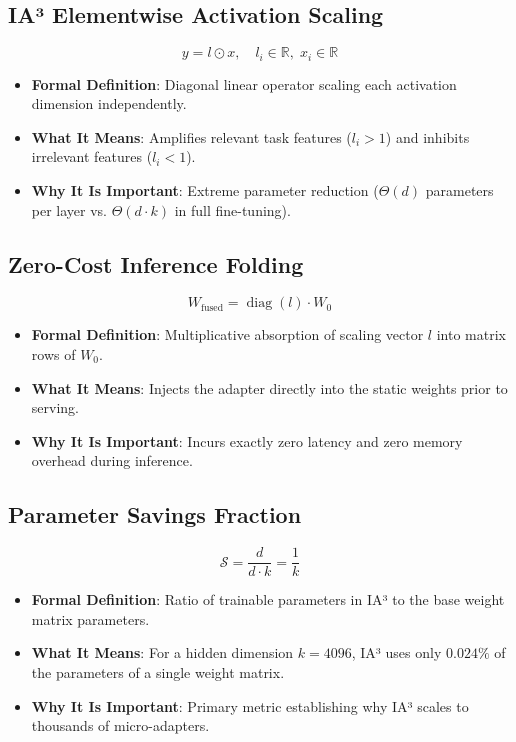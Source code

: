 \documentclass[11pt,a4paper]{article}
\theoremstyle{definition}
\begin{document}
\subsection{IA³ Elementwise Activation Scaling}
{\boldmath
\begin{equation}
y = l \odot x, \quad l_i \in \mathbb{R}, \; x_i \in \mathbb{R}
\end{equation}
}
\begin{itemize}
    \item \textbf{Formal Definition}: Diagonal linear operator scaling each activation dimension independently.
    \item \textbf{What It Means}: Amplifies relevant task features ($l_i > 1$) and inhibits irrelevant features ($l_i < 1$).
    \item \textbf{Why It Is Important}: Extreme parameter reduction ($\Theta(d)$ parameters per layer vs. $\Theta(d \cdot k)$ in full fine-tuning).
\end{itemize}

\subsection{Zero-Cost Inference Folding}
{\boldmath
\begin{equation}
W_{\text{fused}} = \operatorname{diag}(l) \cdot W_0
\end{equation}
}
\begin{itemize}
    \item \textbf{Formal Definition}: Multiplicative absorption of scaling vector $l$ into matrix rows of $W_0$.
    \item \textbf{What It Means}: Injects the adapter directly into the static weights prior to serving.
    \item \textbf{Why It Is Important}: Incurs exactly zero latency and zero memory overhead during inference.
\end{itemize}

\subsection{Parameter Savings Fraction}
{\boldmath
\begin{equation}
\mathcal{S} = \frac{d}{d \cdot k} = \frac{1}{k}
\end{equation}
}
\begin{itemize}
    \item \textbf{Formal Definition}: Ratio of trainable parameters in IA³ to the base weight matrix parameters.
    \item \textbf{What It Means}: For a hidden dimension $k = 4096$, IA³ uses only $0.024\%$ of the parameters of a single weight matrix.
    \item \textbf{Why It Is Important}: Primary metric establishing why IA³ scales to thousands of micro-adapters.
\end{itemize}
\end{document}
